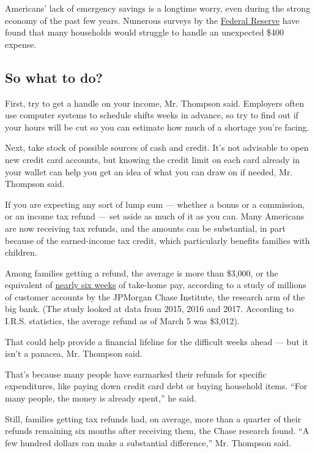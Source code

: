 Americans' lack of emergency savings is a longtime worry, even during
the strong economy of the past few years. Numerous surveys by the
\href{https://www.federalreserve.gov/publications/2019-economic-well-being-of-us-households-in-2018-dealing-with-unexpected-expenses.htm}{Federal
Reserve} have found that many households would struggle to handle an
unexpected \$400 expense.

\hypertarget{so-what-to-do}{%
\subsection{So what to do?}\label{so-what-to-do}}

First, try to get a handle on your income, Mr. Thompson said. Employers
often use computer systems to schedule shifts weeks in advance, so try
to find out if your hours will be cut so you can estimate how much of a
shortage you're facing.

Next, take stock of possible sources of cash and credit. It's not
advisable to open new credit card accounts, but knowing the credit limit
on each card already in your wallet can help you get an idea of what you
can draw on if needed, Mr. Thompson said.

If you are expecting any sort of lump sum --- whether a bonus or a
commission, or an income tax refund --- set aside as much of it as you
can. Many Americans are now receiving tax refunds, and the amounts can
be substantial, in part because of the earned-income tax credit, which
particularly benefits families with children.

Among families getting a refund, the average is more than \$3,000, or
the equivalent of
\href{https://institute.jpmorganchase.com/institute/research/household-income-spending/report-tax-refunds.htm\#finding-2}{nearly
six weeks} of take-home pay, according to a study of millions of
customer accounts by the JPMorgan Chase Institute, the research arm of
the big bank. (The study looked at data from 2015, 2016 and 2017.
According to I.R.S. statistics, the average refund as of March 5 was
\$3,012).

That could help provide a financial lifeline for the difficult weeks
ahead --- but it isn't a panacea, Mr. Thompson said.

That's because many people have earmarked their refunds for specific
expenditures, like paying down credit card debt or buying household
items. ``For many people, the money is already spent,'' he said.

Still, families getting tax refunds had, on average, more than a quarter
of their refunds remaining six months after receiving them, the Chase
research found. ``A few hundred dollars can make a substantial
difference,'' Mr. Thompson said.

